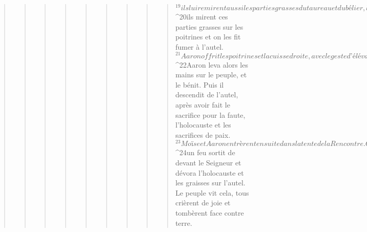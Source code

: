 \begin{verse}
\begin{verse}
\begin{verse}
\begin{verse}
\begin{verse}
\begin{verse}
\begin{verse}
\begin{verse}
\begin{verse}
${}^{19}ils lui remirent aussi les parties grasses du taureau et du bélier, la queue, la graisse qui couvre les entrailles, les rognons et le lobe du foie ; 
${}^{20}ils mirent ces parties grasses sur les poitrines et on les fit fumer à l’autel. 
${}^{21}Aaron offrit les poitrines et la cuisse droite, avec le geste d’élévation devant le Seigneur, comme Moïse l’avait ordonné.
${}^{22}Aaron leva alors les mains sur le peuple, et le bénit. Puis il descendit de l’autel, après avoir fait le sacrifice pour la faute, l’holocauste et les sacrifices de paix. 
${}^{23}Moïse et Aaron entrèrent ensuite dans la tente de la Rencontre. Quand ils en ressortirent, ils bénirent le peuple. Alors la gloire du Seigneur apparut à tout le peuple : 
${}^{24}un feu sortit de devant le Seigneur et dévora l’holocauste et les graisses sur l’autel. Le peuple vit cela, tous crièrent de joie et tombèrent face contre terre.
      

\end{verse}
\end{verse}
\end{verse}
\end{verse}
\end{verse}
\end{verse}
\end{verse}
\end{verse}
\end{verse}
